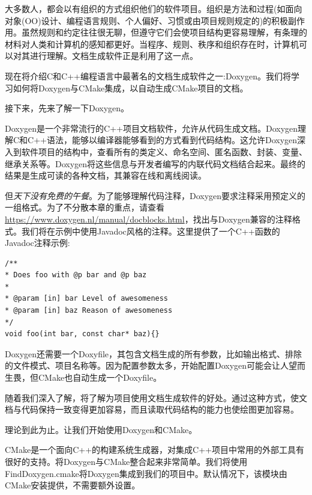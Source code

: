 
大多数人，都会以有组织的方式组织他们的软件项目。组织是方法和过程(如面向对象(OO)设计、编程语言规则、个人偏好、习惯或由项目规则规定的)的积极副作用。虽然规则和约定往往很无聊，但遵守它们会使项目结构更容易理解，有条理的材料对人类和计算机的感知都更好。当程序、规则、秩序和组织存在时，计算机可以对其进行理解。文档生成软件正是利用了这一点。

现在将介绍C和C++编程语言中最著名的文档生成软件之一:Doxygen。我们将学习如何将Doxygen与CMake集成，以自动生成CMake项目的文档。

接下来，先来了解一下Doxygen。


Doxygen是一个非常流行的C++项目文档软件，允许从代码生成文档。Doxygen理解C和C++语法，能够以编译器能够看到的方式看到代码结构。这允许Doxygen深入到软件项目的结构中，查看所有的类定义、命名空间、匿名函数、封装、变量、继承关系等。Doxygen将这些信息与开发者编写的内联代码文档结合起来。最终的结果是生成可读的各种文档，其兼容在线和离线阅读。

但\textit{天下没有免费的午餐}。为了能够理解代码注释，Doxygen要求注释采用预定义的一组格式。为了不分散本章的重点，请查看\url{https://www.doxygen.nl/manual/docblocks.html}，找出与Doxygen兼容的注释格式。我们将在示例中使用Javadoc风格的注释。这里提供了一个C++函数的Javadoc注释示例:

\begin{lstlisting}[style=styleCXX]
/**
* Does foo with @p bar and @p baz
*
* @param [in] bar Level of awesomeness
* @param [in] baz Reason of awesomeness
*/
void foo(int bar, const char* baz){}
\end{lstlisting}

Doxygen还需要一个Doxyfile，其包含文档生成的所有参数，比如输出格式、排除的文件模式、项目名称等。因为配置参数太多，开始配置Doxygen可能会让人望而生畏，但CMake也自动生成一个Doxyfile。

随着我们深入了解，将了解为项目使用文档生成软件的好处。通过这种方式，使文档与代码保持一致变得更加容易，而且读取代码结构的能力也使绘图更加容易。

理论到此为止。让我们开始使用Doxygen和CMake。


CMake是一个面向C++的构建系统生成器，对集成C++项目中常用的外部工具有很好的支持。将Doxygen与CMake整合起来非常简单。我们将使用FindDoxygen.cmake将Doxygen集成到我们的项目中。默认情况下，该模块由CMake安装提供，不需要额外设置。


